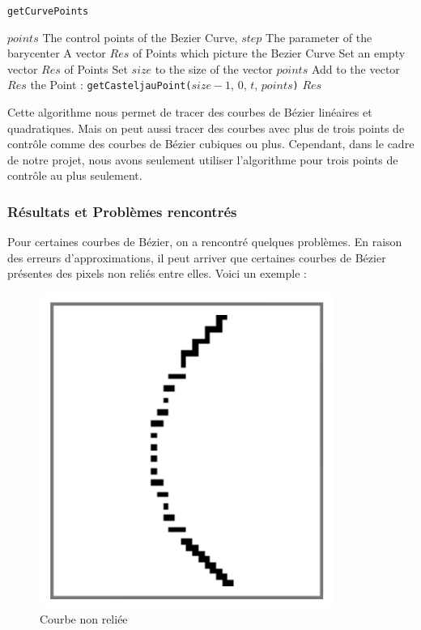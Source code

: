 \documentclass[a4paper, 12pt]{article}
\begin{document}
\begin{algorithm}
	\caption{\texttt{getCurvePoints}}
		\begin{algorithmic}[1]
		\Require $points$ The control points of the Bezier Curve, $step$ The parameter of the barycenter
		\Ensure A vector $Res$ of Points which picture the Bezier Curve
		\State Set an empty vector $Res$ of Points
		\State Set $size$ to the size of the vector $points$
			\State Add to the vector $Res$ the Point : \texttt{getCasteljauPoint(}$size-1$, $0$, $t$, $points$\texttt{)} 
		\EndFor
		\State \Return $Res$
		\EndFunction
		\end{algorithmic}
\end{algorithm}

Cette algorithme nous permet de tracer des courbes de Bézier linéaires et quadratiques. Mais on peut aussi tracer des courbes avec plus de trois points de contrôle comme des courbes de Bézier cubiques ou plus. Cependant, dans le cadre de notre projet, nous avons seulement utiliser l'algorithme pour trois points de contrôle au plus seulement.

\subsubsection{Résultats et Problèmes rencontrés}
Pour certaines courbes de Bézier, on a rencontré quelques problèmes. En raison des erreurs d'approximations, il peut arriver que certaines courbes de Bézier présentes des pixels non reliés entre elles. Voici un exemple : 

\begin{figure}[h]
\centering
\includegraphics[scale=0.3]{Images/BezierCurbe_problem.png}
\caption{Courbe non reliée}
\label{fig2}
\end{figure}
\end{document}
